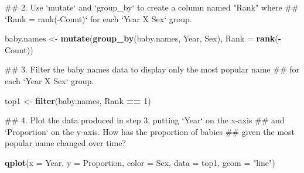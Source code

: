 \documentclass[]{book}
\newenvironment{Shaded}{\begin{snugshade}}{\end{snugshade}}
\newcommand{\KeywordTok}[1]{\textcolor[rgb]{0.13,0.29,0.53}{\textbf{#1}}}
\newcommand{\DataTypeTok}[1]{\textcolor[rgb]{0.13,0.29,0.53}{#1}}
\newcommand{\DecValTok}[1]{\textcolor[rgb]{0.00,0.00,0.81}{#1}}
\newcommand{\StringTok}[1]{\textcolor[rgb]{0.31,0.60,0.02}{#1}}
\newcommand{\OperatorTok}[1]{\textcolor[rgb]{0.81,0.36,0.00}{\textbf{#1}}}
\newcommand{\NormalTok}[1]{#1}
\begin{document}
\begin{Shaded}
\begin{Highlighting}[]
\NormalTok{## 2.  Use `mutate` and `group_by` to create a column named "Rank" where }
\NormalTok{##     `Rank = rank(-Count)` for each `Year X Sex` group.}
\end{Highlighting}
\end{Shaded}

\begin{Shaded}
\begin{Highlighting}[]
\NormalTok{baby.names <-}\StringTok{ }\KeywordTok{mutate}\NormalTok{(}\KeywordTok{group_by}\NormalTok{(baby.names, Year, Sex),}
                     \DataTypeTok{Rank =} \KeywordTok{rank}\NormalTok{(}\OperatorTok{-}\NormalTok{Count))}
\end{Highlighting}
\end{Shaded}

\begin{Shaded}
\begin{Highlighting}[]
\NormalTok{## 3.  Filter the baby names data to display only the most popular name }
\NormalTok{##     for each `Year X Sex` group.}
\end{Highlighting}
\end{Shaded}

\begin{Shaded}
\begin{Highlighting}[]
\NormalTok{top1 <-}\StringTok{ }\KeywordTok{filter}\NormalTok{(baby.names, Rank }\OperatorTok{==}\StringTok{ }\DecValTok{1}\NormalTok{)}
\end{Highlighting}
\end{Shaded}

\begin{Shaded}
\begin{Highlighting}[]
\NormalTok{## 4. Plot the data produced in step 3, putting `Year` on the x-axis}
\NormalTok{##    and `Proportion` on the y-axis. How has the proportion of babies}
\NormalTok{##    given the most popular name changed over time?}
\end{Highlighting}
\end{Shaded}

\begin{Shaded}
\begin{Highlighting}[]
\KeywordTok{qplot}\NormalTok{(}\DataTypeTok{x =}\NormalTok{ Year, }\DataTypeTok{y =}\NormalTok{ Proportion, }\DataTypeTok{color =}\NormalTok{ Sex, }
      \DataTypeTok{data =}\NormalTok{ top1, }
      \DataTypeTok{geom =} \StringTok{"line"}\NormalTok{)}
\end{Highlighting}
\end{Shaded}
\end{document}
